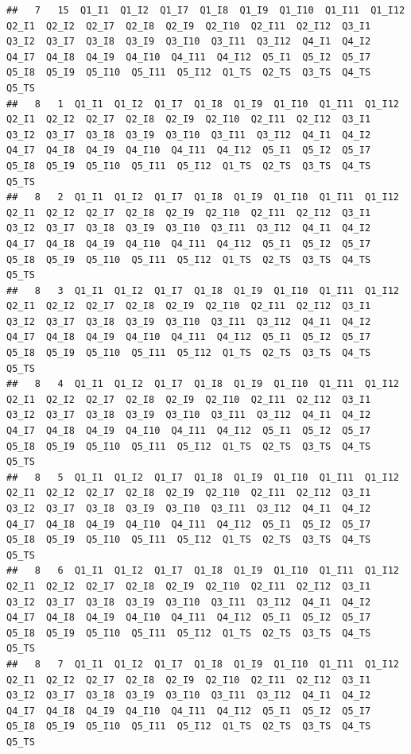 \documentclass[]{book}
\begin{document}
\begin{verbatim}
##   7   15  Q1_I1  Q1_I2  Q1_I7  Q1_I8  Q1_I9  Q1_I10  Q1_I11  Q1_I12  Q2_I1  Q2_I2  Q2_I7  Q2_I8  Q2_I9  Q2_I10  Q2_I11  Q2_I12  Q3_I1  Q3_I2  Q3_I7  Q3_I8  Q3_I9  Q3_I10  Q3_I11  Q3_I12  Q4_I1  Q4_I2  Q4_I7  Q4_I8  Q4_I9  Q4_I10  Q4_I11  Q4_I12  Q5_I1  Q5_I2  Q5_I7  Q5_I8  Q5_I9  Q5_I10  Q5_I11  Q5_I12  Q1_TS  Q2_TS  Q3_TS  Q4_TS  Q5_TS
##   8   1  Q1_I1  Q1_I2  Q1_I7  Q1_I8  Q1_I9  Q1_I10  Q1_I11  Q1_I12  Q2_I1  Q2_I2  Q2_I7  Q2_I8  Q2_I9  Q2_I10  Q2_I11  Q2_I12  Q3_I1  Q3_I2  Q3_I7  Q3_I8  Q3_I9  Q3_I10  Q3_I11  Q3_I12  Q4_I1  Q4_I2  Q4_I7  Q4_I8  Q4_I9  Q4_I10  Q4_I11  Q4_I12  Q5_I1  Q5_I2  Q5_I7  Q5_I8  Q5_I9  Q5_I10  Q5_I11  Q5_I12  Q1_TS  Q2_TS  Q3_TS  Q4_TS  Q5_TS
##   8   2  Q1_I1  Q1_I2  Q1_I7  Q1_I8  Q1_I9  Q1_I10  Q1_I11  Q1_I12  Q2_I1  Q2_I2  Q2_I7  Q2_I8  Q2_I9  Q2_I10  Q2_I11  Q2_I12  Q3_I1  Q3_I2  Q3_I7  Q3_I8  Q3_I9  Q3_I10  Q3_I11  Q3_I12  Q4_I1  Q4_I2  Q4_I7  Q4_I8  Q4_I9  Q4_I10  Q4_I11  Q4_I12  Q5_I1  Q5_I2  Q5_I7  Q5_I8  Q5_I9  Q5_I10  Q5_I11  Q5_I12  Q1_TS  Q2_TS  Q3_TS  Q4_TS  Q5_TS
##   8   3  Q1_I1  Q1_I2  Q1_I7  Q1_I8  Q1_I9  Q1_I10  Q1_I11  Q1_I12  Q2_I1  Q2_I2  Q2_I7  Q2_I8  Q2_I9  Q2_I10  Q2_I11  Q2_I12  Q3_I1  Q3_I2  Q3_I7  Q3_I8  Q3_I9  Q3_I10  Q3_I11  Q3_I12  Q4_I1  Q4_I2  Q4_I7  Q4_I8  Q4_I9  Q4_I10  Q4_I11  Q4_I12  Q5_I1  Q5_I2  Q5_I7  Q5_I8  Q5_I9  Q5_I10  Q5_I11  Q5_I12  Q1_TS  Q2_TS  Q3_TS  Q4_TS  Q5_TS
##   8   4  Q1_I1  Q1_I2  Q1_I7  Q1_I8  Q1_I9  Q1_I10  Q1_I11  Q1_I12  Q2_I1  Q2_I2  Q2_I7  Q2_I8  Q2_I9  Q2_I10  Q2_I11  Q2_I12  Q3_I1  Q3_I2  Q3_I7  Q3_I8  Q3_I9  Q3_I10  Q3_I11  Q3_I12  Q4_I1  Q4_I2  Q4_I7  Q4_I8  Q4_I9  Q4_I10  Q4_I11  Q4_I12  Q5_I1  Q5_I2  Q5_I7  Q5_I8  Q5_I9  Q5_I10  Q5_I11  Q5_I12  Q1_TS  Q2_TS  Q3_TS  Q4_TS  Q5_TS
##   8   5  Q1_I1  Q1_I2  Q1_I7  Q1_I8  Q1_I9  Q1_I10  Q1_I11  Q1_I12  Q2_I1  Q2_I2  Q2_I7  Q2_I8  Q2_I9  Q2_I10  Q2_I11  Q2_I12  Q3_I1  Q3_I2  Q3_I7  Q3_I8  Q3_I9  Q3_I10  Q3_I11  Q3_I12  Q4_I1  Q4_I2  Q4_I7  Q4_I8  Q4_I9  Q4_I10  Q4_I11  Q4_I12  Q5_I1  Q5_I2  Q5_I7  Q5_I8  Q5_I9  Q5_I10  Q5_I11  Q5_I12  Q1_TS  Q2_TS  Q3_TS  Q4_TS  Q5_TS
##   8   6  Q1_I1  Q1_I2  Q1_I7  Q1_I8  Q1_I9  Q1_I10  Q1_I11  Q1_I12  Q2_I1  Q2_I2  Q2_I7  Q2_I8  Q2_I9  Q2_I10  Q2_I11  Q2_I12  Q3_I1  Q3_I2  Q3_I7  Q3_I8  Q3_I9  Q3_I10  Q3_I11  Q3_I12  Q4_I1  Q4_I2  Q4_I7  Q4_I8  Q4_I9  Q4_I10  Q4_I11  Q4_I12  Q5_I1  Q5_I2  Q5_I7  Q5_I8  Q5_I9  Q5_I10  Q5_I11  Q5_I12  Q1_TS  Q2_TS  Q3_TS  Q4_TS  Q5_TS
##   8   7  Q1_I1  Q1_I2  Q1_I7  Q1_I8  Q1_I9  Q1_I10  Q1_I11  Q1_I12  Q2_I1  Q2_I2  Q2_I7  Q2_I8  Q2_I9  Q2_I10  Q2_I11  Q2_I12  Q3_I1  Q3_I2  Q3_I7  Q3_I8  Q3_I9  Q3_I10  Q3_I11  Q3_I12  Q4_I1  Q4_I2  Q4_I7  Q4_I8  Q4_I9  Q4_I10  Q4_I11  Q4_I12  Q5_I1  Q5_I2  Q5_I7  Q5_I8  Q5_I9  Q5_I10  Q5_I11  Q5_I12  Q1_TS  Q2_TS  Q3_TS  Q4_TS  Q5_TS

\end{verbatim}
\end{document}
